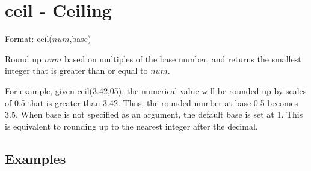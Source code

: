 
%

\section{ceil - Ceiling\label{sect:ceil}}

Format: ceil($num$,base)

Round up $num$ based on multiples of the base number, and returns the smallest integer that is greater than or equal to $num$. 

For example, given ceil(3.42,05), the numerical value will be rounded up by scales of 0.5 that is greater than 3.42. Thus, the rounded number at base 0.5 becomes 3.5. When base is not specified as an argument, the default base is set at 1. 
This is equivalent to rounding up to the nearest integer after the decimal. 
 

\subsection*{Examples}


%

